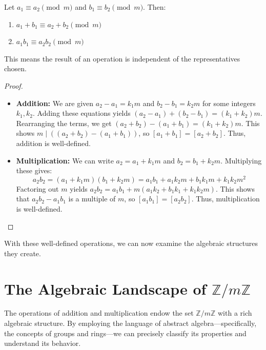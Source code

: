 \begin{proposition}[Compatibility]
Let $a_1 \equiv a_2 \pmod{m}$ and $b_1 \equiv b_2 \pmod{m}$. Then:
\begin{enumerate}
    \item $a_1 + b_1 \equiv a_2 + b_2 \pmod{m}$
    \item $a_1b_1 \equiv a_2b_2 \pmod{m}$
\end{enumerate}
\end{proposition}
This means the result of an operation is independent of the representatives chosen.

\begin{proof}
\begin{itemize}
    \item \textbf{Addition:} We are given $a_2 - a_1 = k_1m$ and $b_2 - b_1 = k_2m$ for some integers $k_1, k_2$. Adding these equations yields $(a_2 - a_1) + (b_2 - b_1) = (k_1 + k_2)m$. Rearranging the terms, we get $(a_2 + b_2) - (a_1 + b_1) = (k_1 + k_2)m$. This shows $m \mid ((a_2 + b_2) - (a_1 + b_1))$, so $[a_1 + b_1] = [a_2 + b_2]$. Thus, addition is well-defined.
    \item \textbf{Multiplication:} We can write $a_2 = a_1 + k_1m$ and $b_2 = b_1 + k_2m$. Multiplying these gives:
    $$ a_2b_2 = (a_1 + k_1m)(b_1 + k_2m) = a_1b_1 + a_1k_2m + b_1k_1m + k_1k_2m^2 $$
    Factoring out $m$ yields $a_2b_2 = a_1b_1 + m(a_1k_2 + b_1k_1 + k_1k_2m)$. This shows that $a_2b_2 - a_1b_1$ is a multiple of $m$, so $[a_1b_1] = [a_2b_2]$. Thus, multiplication is well-defined.
\end{itemize}
\end{proof}
With these well-defined operations, we can now examine the algebraic structures they create.

\section{The Algebraic Landscape of $\mathbb{Z}/m\mathbb{Z}$}
The operations of addition and multiplication endow the set $\mathbb{Z}/m\mathbb{Z}$ with a rich algebraic structure. By employing the language of abstract algebra---specifically, the concepts of groups and rings---we can precisely classify its properties and understand its behavior.

